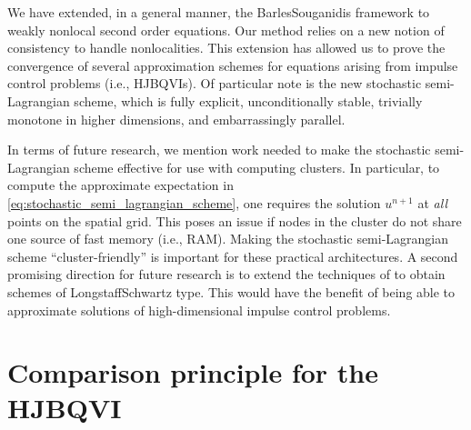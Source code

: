 \documentclass[12pt]{article}
\begin{document}
We have extended, in a general manner, the Barles\textendash Souganidis
framework to weakly nonlocal second order equations. Our method relies
on a new notion of consistency to handle nonlocalities. This extension
has allowed us to prove the convergence of several approximation
schemes for equations arising from impulse control problems (i.e.,
HJBQVIs). Of particular note is the new
stochastic semi-Lagrangian scheme,
which is fully explicit, unconditionally stable, trivially monotone
in higher dimensions, and embarrassingly parallel.

In terms of future research, we mention work needed to make the stochastic
semi-Lagrangian scheme effective for use with computing clusters.
In particular, to compute the approximate expectation in \eqref{eq:stochastic_semi_lagrangian_scheme},
one requires the solution $u^{n+1}$ at \emph{all} points on the spatial
grid. This poses an issue if nodes in the cluster do not
share one source of fast memory (i.e., RAM). Making the stochastic
semi-Lagrangian scheme ``cluster-friendly'' is important for these
practical architectures. A second promising direction for future research
is to extend the techniques of \cite{MR2857450,MR3190342} to obtain
schemes of Longstaff\textendash Schwartz type. This would
have the benefit of being able to approximate solutions of high-dimensional impulse control problems.

{{\small}
}

\appendix

\section{\label{app:comparison_principle}Comparison principle for the HJBQVI}
\end{document}
